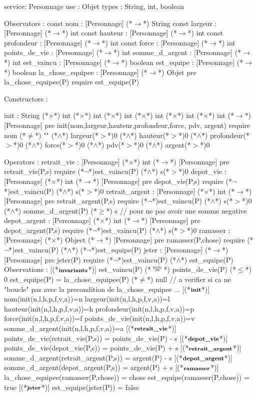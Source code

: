 \documentclass[a4paper, 11pt]{report}
\newcommand{\specB}[1]{\footnotesize\textbf{#1}}
\begin{document}
\begin{Spe}
service: Personnage
use : Objet
types : String, int, boolean

Observators : 
	const nom : [Personnage] (*$\rightarrow$*) String
	const largeur : [Personnage] (*$\rightarrow$*) int
	const hauteur : [Personnage] (*$\rightarrow$*) int
	const profondeur : [Personnage] (*$\rightarrow$*) int
	const force : [Personnage] (*$\rightarrow$*) int 
	points_de_vie : [Personnage] (*$\rightarrow$*) int
	somme_d_argent : [Personnage] (*$\rightarrow$*) int 
	est_vaincu : [Personnage] (*$\rightarrow$*) boolean 
	est_equipe : [Personnage] (*$\rightarrow$*) boolean 
	la_chose_equipee : [Personnage] (*$\rightarrow$*) Objet
		pre la_chose_equipee(P) require est_equipe(P)

Constructors : 

	init : String (*$\times$*) int (*$\times$*) int (*$\times$*) int (*$\times$*) int (*$\times$*) int (*$\times$*) int (*$\rightarrow$*) [Personnage]
		pre init(nom,largeur,hauteur,profondeur,force, pdv, argent) require nom (*$\ne$*) "" (*$\land$*) largeur(*$>$*)0 (*$\land$*) hauteur(*$>$*)0 (*$\land$*) profondeur(*$>$*)0 (*$\land$*) force(*$>$*)0 (*$\land$*) pdv(*$>$*)0 (*$\land$*) argent(*$>$*)0 

Operators :
	retrait_vie :  [Personnage] (*$\times$*) int (*$\rightarrow$*) [Personnage]
		pre retrait_vie(P,s) require (*$\lnot$*)est_vaincu(P) (*$\land$*) s(*$>$*)0
	depot_vie : [Personnage] (*$\times$*) int (*$\rightarrow$*) [Personnage]
		pre depot_vie(P,s) require (*$\lnot$*)est_vaincu(P) (*$\land$*) s(*$>$*)0
	retrait_argent :  [Personnage] (*$\times$*) int (*$\rightarrow$*) [Personnage]
		pre retrait_argent(P,s) require (*$\lnot$*)est_vaincu(P) (*$\land$*) s(*$>$*)0 (*$\land$*) somme_d_argent(P) (*$\ge$*) s // pour ne pas avoir une somme negative
	depot_argent : [Personnage] (*$\times$*) int (*$\rightarrow$*) [Personnage]
		pre depot_argent(P,s) require (*$\lnot$*)est_vaincu(P) (*$\land$*) s(*$>$*)0
	ramasser : [Personnage] (*$\times$*) Object (*$\rightarrow$*) [Personnage]
		pre ramasser(P,chose) require (*$\lnot$*)est_vaincu(P) (*$\land$*) (*$\lnot$*)est_equipe(P)
	jeter : [Personnage] (*$\rightarrow$*) [Personnage]
		pre jeter(P) require (*$\lnot$*)est_vaincu(P) (*$\land$*) est_equipe(P)
Observations : 
	[(*$\specB{invariants}$*)]
		est_vaincu(P) (*$\stackrel{min}{=}$*) points_de_vie(P) (*$\le$*) 0
		est_equipe(P) = la_chose_equipee(P) (*$\ne$*) null // a verifier si ca ne "boucle" pas avec la precondition de la_chose_equipee ...
	[(*$\specB{init}$*)]
		nom(init(n,l,h,p,f,v,a))=n
		largeur(init(n,l,h,p,f,v,a))=l
		hauteur(init(n,l,h,p,f,v,a))=h
		profondeur(init(n,l,h,p,f,v,a))=p
		force(init(n,l,h,p,f,v,a))=f
		points_de_vie(init(n,l,h,p,f,v,a))=v
		somme_d_argent(init(n,l,h,p,f,v,a))=a
	[(*$\specB{retrait\_vie}$*)]
		points_de_vie(retrait_vie(P,s)) = points_de_vie(P) - s
	[(*$\specB{depot\_vie}$*)]
		points_de_vie(depot_vie(P,s)) = points_de_vie(P) + s 
	[(*$\specB{retrait\_argent}$*)]
		somme_d_argent(retrait_argent(P,s)) = argent(P) - s 
	[(*$\specB{depot\_argent}$*)]
		somme_d_argent(depot_argent(P,s)) = argent(P) + s 
	[(*$\specB{ramasser}$*)]
		la_chose_equipee(ramasser(P,chose)) = chose 
		est_equipe(ramasser(P,chose)) = true
	[(*$\specB{jeter}$*)]
		est_equipe(jeter(P)) = false 
\end{Spe}
\end{document}
